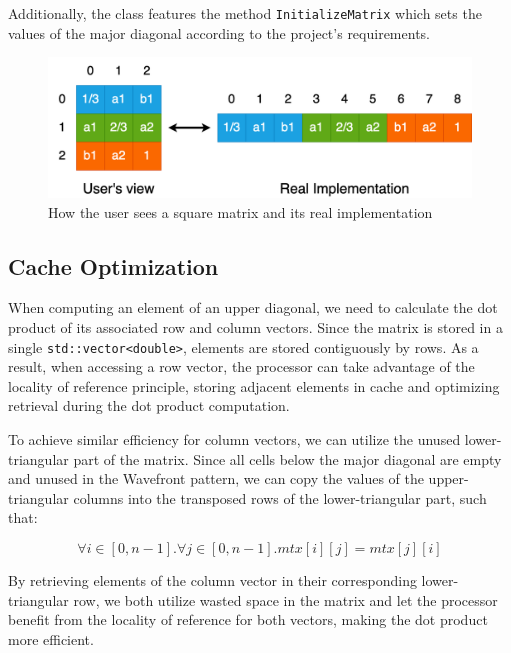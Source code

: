 \par Additionally, the class features the method \texttt{InitializeMatrix} which sets the values of the major diagonal according to the project's requirements.

\begin{figure}[h]
    \centering\includegraphics[scale=0.35]{img/Sequential Implementation/SquareMatriximpl.drawio.png}
    
    \caption{How the user sees a square matrix and its real implementation}
\end{figure}

\subsection*{Cache Optimization}
When computing an element of an upper diagonal, we need to calculate the dot product of its associated row and column vectors. Since the matrix is stored in a single \texttt{std::vector<double>}, elements are stored contiguously by rows. As a result, when accessing a row vector, the processor can take advantage of the locality of reference principle, storing adjacent elements in cache and optimizing retrieval during the dot product computation.
\par To achieve similar efficiency for column vectors, we can utilize the unused lower-triangular part of the matrix. Since all cells below the major diagonal are empty and unused in the Wavefront pattern, we can copy the values of the upper-triangular columns into the transposed rows of the lower-triangular part, such that:

\begin{equation}
    \forall i \in [0, n - 1]. \forall j \in [0, n - 1]. mtx[i][j] = mtx[j][i]
\end{equation}

By retrieving elements of the column vector in their corresponding lower-triangular row, we both utilize wasted space in the matrix and let the processor benefit from the locality of reference for both vectors, making the dot product more efficient.

